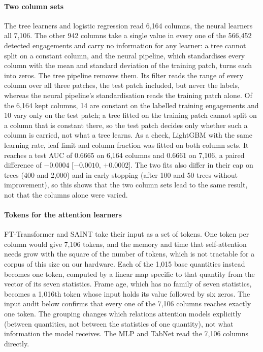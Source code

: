 \paragraph{Two column sets}
The tree learners and logistic regression read 6,164 columns, the neural learners all 7,106. The other
942 columns take a single value in every one of the 566,452 detected engagements and carry no information
for any learner: a tree cannot split on a constant column, and the neural pipeline, which standardises
every column with the mean and standard deviation of the training patch, turns each into zeros. The tree
pipeline removes them. Its filter reads the range of every column over all three patches, the test patch
included, but never the labels, whereas the neural pipeline's standardisation reads the training patch
alone. Of the 6,164 kept columns, 14 are constant on the labelled training engagements and 10 vary only on
the test patch; a tree fitted on the training patch cannot split on a column that is constant there, so the
test patch decides only whether such a column is carried, not what a tree learns. As a check, LightGBM
with the same learning rate, leaf limit and column fraction was fitted on both column sets. It reaches a
test AUC of 0.6665 on 6,164 columns and 0.6661 on 7,106, a paired difference of $-0.0004$ [$-0.0010$,
$+0.0002$]. The two fits also differ in their cap on trees (400 and 2,000) and in early stopping (after
100 and 50 trees without improvement), so this shows that the two column sets lead to the same result,
not that the columns alone were varied.

\paragraph{Tokens for the attention learners}
FT-Transformer and SAINT take their input as a set of tokens. One token per column would give 7,106
tokens, and the memory and time that self-attention needs grow with the square of the number of tokens,
which is not tractable for a corpus of this size on our hardware. Each of the 1,015 base quantities
instead becomes one token, computed by a linear map specific to that quantity from the vector of its seven
statistics. Frame age, which has no family of seven statistics, becomes a 1,016th token whose input holds
its value followed by six zeros. The input audit below confirms that every one of the 7,106 columns
reaches exactly one token. The grouping changes which relations attention models explicitly (between
quantities, not between the statistics of one quantity), not what information the model receives. The MLP
and TabNet read the 7,106 columns directly.

